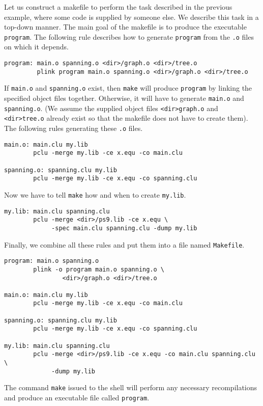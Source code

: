 Let us construct a makefile to perform the task described in the
previous example, where some code is supplied by someone else.  We
describe this task in a top-down manner.  The main goal of the
makefile is to produce the executable \verb|program|. The following
rule describes how to generate \verb|program| from the \verb|.o| files
on which it depends.

\begin{indenttext}
\begin{verbatim}
program: main.o spanning.o <dir>/graph.o <dir>/tree.o
         plink program main.o spanning.o <dir>/graph.o <dir>/tree.o
\end{verbatim}
\end{indenttext}

\noindent If \verb|main.o| and \verb|spanning.o| exist, then
\verb|make| will produce \verb|program| by linking the specified
object files together. Otherwise, it will have to generate
\verb|main.o| and \verb|spanning.o|. (We assume the supplied object
files \verb|<dir>graph.o| and \verb|<dir>tree.o| already exist so that
the makefile does not have to create them).  The following rules
generating these \verb|.o| files.

\begin{indenttext}
\begin{verbatim}
main.o: main.clu my.lib
        pclu -merge my.lib -ce x.equ -co main.clu

spanning.o: spanning.clu my.lib
        pclu -merge my.lib -ce x.equ -co spanning.clu
\end{verbatim}
\end{indenttext}

\noindent Now we have to tell \verb|make| how and when to create
\verb|my.lib|.

\begin{indenttext}
\begin{verbatim}
my.lib: main.clu spanning.clu
        pclu -merge <dir>/ps9.lib -ce x.equ \
             -spec main.clu spanning.clu -dump my.lib
\end{verbatim}
\end{indenttext}

\noindent Finally, we combine all these rules and put them into a file
named \verb|Makefile|.

\begin{indenttext}
\begin{verbatim}
program: main.o spanning.o
        plink -o program main.o spanning.o \
                <dir>/graph.o <dir>/tree.o

main.o: main.clu my.lib
        pclu -merge my.lib -ce x.equ -co main.clu

spanning.o: spanning.clu my.lib
        pclu -merge my.lib -ce x.equ -co spanning.clu

my.lib: main.clu spanning.clu
        pclu -merge <dir>/ps9.lib -ce x.equ -co main.clu spanning.clu \
             -dump my.lib
\end{verbatim}
\end{indenttext}

\noindent The command \verb|make| issued to the shell will perform any
necessary recompilations and produce an executable file called
\verb|program|.


